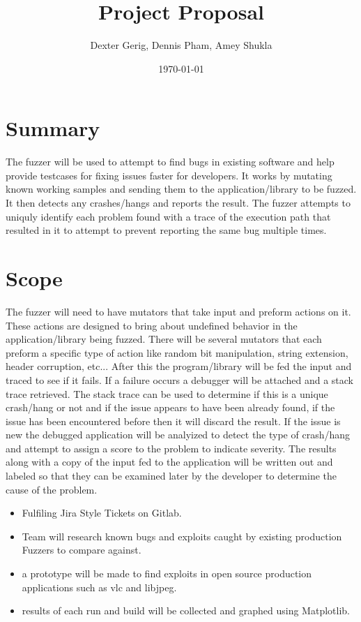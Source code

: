 \documentclass[12pt, a4paper]{article}
\title{Project Proposal}
\author{Dexter Gerig, Dennis Pham, Amey Shukla}
\date{\today}
\begin{document}
\begin{titlepage}
  \maketitle
\end{titlepage}

\section{Summary}
The fuzzer will be used to attempt to find bugs in existing software and help provide testcases for fixing issues faster for developers. It works by mutating known working samples and sending them to the application/library to be fuzzed. It then detects any crashes/hangs and reports the result. The fuzzer attempts to uniquly identify each problem found with a trace of the execution path that resulted in it to attempt to prevent reporting the same bug multiple times.

\section{Scope}
The fuzzer will need to have mutators that take input and preform actions on it. These actions are designed to bring about undefined behavior in the application/library being fuzzed. There will be several mutators that each preform a specific type of action like random bit manipulation, string extension, header corruption, etc... After this the program/library will be fed the input and traced to see if it fails. If a failure occurs a debugger will be attached and a stack trace retrieved. The stack trace can be used to determine if this is a unique crash/hang or not and if the issue appears to have been already found, if the issue has been encountered before then it will discard the result. If the issue is new the debugged application will be analyized to detect the type of crash/hang and attempt to assign a score to the problem to indicate severity. The results along with a copy of the input fed to the application will be written out and labeled so that they can be examined later by the developer to determine the cause of the problem.

\begin{itemize}
  \item Fulfiling Jira Style Tickets on Gitlab.
  \item Team will research known bugs and exploits caught by existing production Fuzzers to compare against.
  \item a prototype will be made to find exploits in open source production applications such as vlc and libjpeg.
  \item results of each run and build will be collected and graphed using Matplotlib.
\end{itemize}
\end{document}
